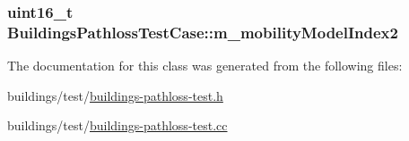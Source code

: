 \subsubsection[{\texorpdfstring{m\+\_\+mobility\+Model\+Index2}{m_mobilityModelIndex2}}]{\setlength{\rightskip}{0pt plus 5cm}uint16\+\_\+t Buildings\+Pathloss\+Test\+Case\+::m\+\_\+mobility\+Model\+Index2\hspace{0.3cm}{\ttfamily [private]}}\hypertarget{classBuildingsPathlossTestCase_a414f4e3129ea9e835f67007bbb6134b0}{}\label{classBuildingsPathlossTestCase_a414f4e3129ea9e835f67007bbb6134b0}


The documentation for this class was generated from the following files\+:\begin{DoxyCompactItemize}
\item 
buildings/test/\hyperlink{buildings-pathloss-test_8h}{buildings-\/pathloss-\/test.\+h}\item 
buildings/test/\hyperlink{buildings-pathloss-test_8cc}{buildings-\/pathloss-\/test.\+cc}\end{DoxyCompactItemize}
